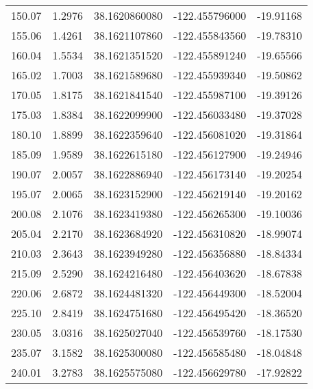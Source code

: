 \begin{scriptsize}
\begin{longtable}{p{2.5cm}p{2.5cm}p{3cm}p{3cm}p{2.5cm}}
           150.07  & 	 1.2976 &               38.1620860080  &   -122.455796000   &	-19.91168 \\
           155.06  & 	 1.4261 &               38.1621107860  &   -122.455843560   &	-19.78310 \\
           160.04  & 	 1.5534 &               38.1621351520  &   -122.455891240   &	-19.65566 \\
           165.02  & 	 1.7003 &               38.1621589680  &   -122.455939340   &	-19.50862 \\
           170.05  & 	 1.8175 &               38.1621841540  &   -122.455987100   &	-19.39126 \\
           175.03  & 	 1.8384 &               38.1622099900  &   -122.456033480   &	-19.37028 \\
           180.10  & 	 1.8899 &               38.1622359640  &   -122.456081020   &	-19.31864 \\
           185.09  & 	 1.9589 &               38.1622615180  &   -122.456127900   &	-19.24946 \\
           190.07  & 	 2.0057 &               38.1622886940  &   -122.456173140   &	-19.20254 \\
           195.07  & 	 2.0065 &               38.1623152900  &   -122.456219140   &	-19.20162 \\
           200.08  & 	 2.1076 &               38.1623419380  &   -122.456265300   &	-19.10036 \\
           205.04  & 	 2.2170 &               38.1623684920  &   -122.456310820   &	-18.99074 \\
           210.03  & 	 2.3643 &               38.1623949280  &   -122.456356880   &	-18.84334 \\
           215.09  & 	 2.5290 &               38.1624216480  &   -122.456403620   &	-18.67838 \\
           220.06  & 	 2.6872 &               38.1624481320  &   -122.456449300   &	-18.52004 \\
           225.10  & 	 2.8419 &               38.1624751680  &   -122.456495420   &	-18.36520 \\
           230.05  & 	 3.0316 &               38.1625027040  &   -122.456539760   &	-18.17530 \\
           235.07  & 	 3.1582 &               38.1625300080  &   -122.456585480   &	-18.04848 \\
           240.01  & 	 3.2783 &               38.1625575080  &   -122.456629780   &	-17.92822 \\

\end{longtable}
\end{scriptsize}
